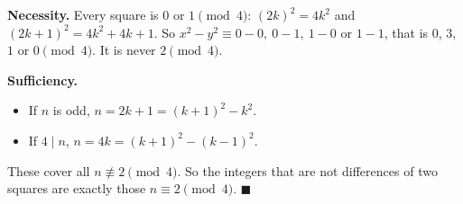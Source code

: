\textbf{Necessity.} Every square is $0$ or $1\pmod4$: $(2k)^2=4k^2$ and $(2k+1)^2=4k^2+4k+1$. So $x^2-y^2\equiv0-0,\ 0-1,\ 1-0$ or $1-1$, that is $0$, $3$, $1$ or $0\pmod4$. It is never $2\pmod4$.

\textbf{Sufficiency.}
\begin{itemize}
\item If $n$ is odd, $n=2k+1=(k+1)^2-k^2$.
\item If $4\mid n$, $n=4k=(k+1)^2-(k-1)^2$.
\end{itemize}
These cover all $n\not\equiv2\pmod4$. So the integers that are not differences of two squares are exactly those $\boxed{n\equiv2\pmod4}$. $\blacksquare$
